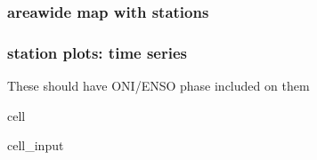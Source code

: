 \documentclass[letterpaper,10pt,english]{jupyterBook}
\begin{document}
\subsubsection{area\sphinxhyphen{}wide map with stations}
\label{\detokenize{notebooks/regional_and_local/SL_anomaly_annual:area-wide-map-with-stations}}

\subsubsection{station plots: time series}
\label{\detokenize{notebooks/regional_and_local/SL_anomaly_annual:station-plots-time-series}}
\sphinxAtStartPar
These should have ONI/ENSO phase included on them

\begin{sphinxuseclass}{cell}\begin{sphinxVerbatimInput}

\begin{sphinxuseclass}{cell_input}
\begin{sphinxVerbatim}[commandchars=\\\{\}]
       

     
     


\end{sphinxVerbatim}
\end{sphinxuseclass}
\end{sphinxVerbatimInput}
\end{sphinxuseclass}
\end{document}
